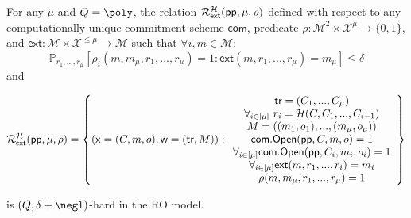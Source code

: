 \begin{lemma}\label{lem:ExtQHard}
For any $\mu$ and $Q = \poly$, the relation $\mathcal{R}^{\mathcal{H}}_\textsf{ext}(\textsf{pp}, \mu, \rho)$ defined with respect to any computationally-unique commitment scheme $\mathsf{com}$, predicate $\rho: \mathcal{M}^2 \times \mathcal{X}^\mu \rightarrow \{0, 1\}$, and $\textsf{ext}: \mathcal{M} \times \mathcal{X}^{\leq \mu} \rightarrow \mathcal{M}$ such that $\forall i, m \in \mathcal{M}$: 
$$\mathbb{P}_{r_1,...,r_{\mu}}[\rho_i(m, m_\mu, r_1,...,r_{\mu}) = 1: \textsf{ext}(m, r_1,...,r_{\mu}) = m_\mu] \leq \delta $$
and 

$$\mathcal{R}^{\mathcal{H}}_\textsf{ext}(\textsf{pp}, \mu, \rho) = \left\{(\mathsf{x} = (C, m, o), \mathsf{w} = (\textsf{{tr}}, M)): \begin{array}{c} \textsf{{tr}} = (C_1,...,C_\mu) \\ \forall_{i \in [\mu]} \ r_i = \mathcal{H}(C, C_1,...,C_{i-1}) \\ M = ((m_1,o_1),...,(m_\mu, o_\mu)) \\ \textsf{com}.\textsf{{Open}}(\textsf{pp}, C, m, o) = 1 \\ \forall_{i \in [\mu]} \textsf{com}.\textsf{{Open}}(\textsf{pp},C_i, m_i, o_i) = 1 \\ \forall_{i \in [\mu]}\textsf{ext}(m, r_1,...,r_{i}) = m_i \\ \rho(m, m_\mu, r_1,...,r_\mu) = 1  \end{array} \right\} $$ 
	
is $(Q, \delta + \negl)$-hard in the RO model. 

\end{lemma}
